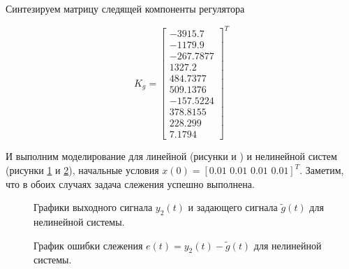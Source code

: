 Синтезируем матрицу следящей компоненты регулятора

\begin{equation}
	K_g = \begin{bmatrix}
		-3915.7\\	-1179.9\\	-267.7877\\	1327.2\\	484.7377\\	509.1376\\	-157.5224\\	378.8155\\	228.299\\	7.1794
	\end{bmatrix}^T
\end{equation}

И выполним моделирование для линейной (рисунки и ) и нелинейной систем (рисунки \ref{5_g_nonlin_another} и \ref{5_g_nonlin_another_e}), начальные условия $x(0) = 
[0.01 \,\, 0.01 \,\, 0.01 \,\, 0.01]^T$. Заметим, что в обоих случаях задача слежения успешно выполнена.


\begin{figure}[!h]
	\caption{Графики выходного сигнала $y_2(t)$ и задающего сигнала $\tilde{g}(t)$ для нелинейной системы.}
	\label{5_g_nonlin_another}
\end{figure}

\begin{figure}[!h]
	\caption{График ошибки слежения $e(t) = y_2(t)-\tilde{g}(t)$ для нелинейной системы.}
	\label{5_g_nonlin_another_e}
\end{figure}



\endinput
